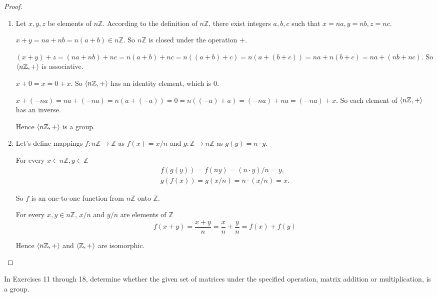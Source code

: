 \begin{proof}
    \begin{enumerate}[label={\textbf{\alph*.}}]
        \item Let $x, y, z$ be elements of $n\mathbb{Z}$. According to the definition of $n\mathbb{Z}$, there exist integers $a, b, c$ such that $x = na, y = nb, z = nc$.

              $x + y = na + nb = n(a + b)\in n\mathbb{Z}$. So $n\mathbb{Z}$ is closed under the operation $+$.

              $(x + y) + z = (na + nb) + nc = n(a + b) + nc = n((a + b) + c) = n(a + (b + c)) = na + n(b + c) = na + (nb + nc)$. So $\left\langle{n\mathbb{Z}, +}\right\rangle$ is associative.

              $x + 0 = x = 0 + x$. So $\left\langle{n\mathbb{Z}, +}\right\rangle$ has an identity element, which is $0$.

              $x + (-na) = na + (-na) = n (a + (-a)) = 0 = n ((-a) + a) = (-na) + na = (-na) + x$. So each element of $\left\langle{n\mathbb{Z}, +}\right\rangle$ has an inverse.

              Hence $\left\langle{n\mathbb{Z}, +}\right\rangle$ is a group.
        \item Let's define mappings $f: n\mathbb{Z} \to \mathbb{Z}$ as $f(x) = x/n$ and $g: \mathbb{Z} \to n\mathbb{Z}$ as $g(y) = n\cdot y$.

              For every $x\in n\mathbb{Z}, y\in\mathbb{Z}$
              \[
                  \begin{split}
                      f(g(y)) = f(ny) = (n\cdot y)/n = y, \\
                      g(f(x)) = g(x/n) = n\cdot (x/n) = x.
                  \end{split}
              \]

              So $f$ is an one-to-one function from $n\mathbb{Z}$ onto $\mathbb{Z}$.

              For every $x, y\in n\mathbb{Z}$, $x/n$ and $y/n$ are elements of $\mathbb{Z}$
              \[
                  f(x + y) = \frac{x + y}{n} = \frac{x}{n} + \frac{y}{n} = f(x) + f(y)
              \]

              Hence $\left\langle{n\mathbb{Z}, +}\right\rangle$ and $\left\langle{\mathbb{Z}, +}\right\rangle$ are isomorphic.
    \end{enumerate}
\end{proof}

In Exercises 11 through 18, determine whether the given set of matrices under the specified operation, matrix addition or multiplication, is a group.

